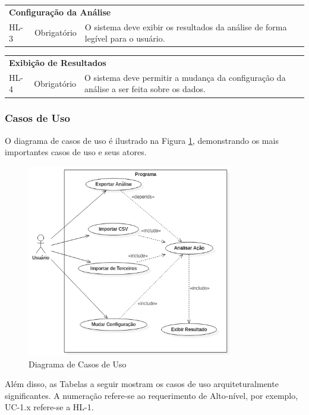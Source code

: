 \documentclass[12pt]{article}
\begin{document}
\begin{tabular}{|p{1cm} p{2cm} p{9cm}|}
	\hline
	\multicolumn{3}{|l|}{\textbf{Configuração da Análise}}\\
	HL-3 & Obrigatório & O sistema deve exibir os resultados da análise de forma legível para
						 o usuário.\\
	\hline
\end{tabular}

\begin{tabular}{|p{1cm} p{2cm} p{9cm}|}
	\hline
	\multicolumn{3}{|l|}{\textbf{Exibição de Resultados}}\\
	HL-4 & Obrigatório & O sistema deve permitir a mudança da configuração da análise a ser
						 feita sobre os dados.\\
	\hline
\end{tabular}

\endgroup

\subsubsection{Casos de Uso}\label{sec:UseCases}

O diagrama de casos de uso é ilustrado na Figura \ref{fig:UseCaseDiagram}, demonstrando os mais
importantes casos de uso e seus atores.

\begin{figure}[H]
	\centering
	\includegraphics[width=0.8\textwidth]{UseCaseDiagram.png}
	\caption{Diagrama de Casos de Uso}\label{fig:UseCaseDiagram}
\end{figure}

Além disso, as Tabelas a seguir mostram os casos de uso arquiteturalmente significantes.
A numeração refere-se ao requerimento de Alto-nível, por exemplo, UC-1.x refere-se a HL-1.
\end{document}
